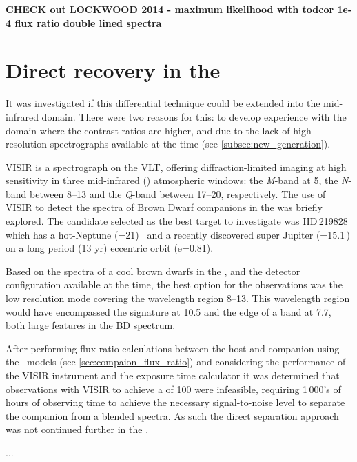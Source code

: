 \textbf{
CHECK out LOCKWOOD 2014 - maximum likelihood with todcor 1e-4 flux ratio double lined spectra}




\section{Direct recovery in the \mir{}}
It was investigated if this differential technique could be extended into the mid-infrared {\mir{}} domain.
There were two reasons for this: to develop experience with the {\mir{}} domain where the contrast ratios are higher, and due to the lack of high-resolution \nir{} spectrographs available at the time (see \cref{subsec:new_generation}).

{VISIR} is a \mir{} spectrograph on the {VLT}, offering diffraction-limited imaging at high sensitivity in three mid-infrared (\mir) atmospheric windows: the \emph{M}-band at 5\um{}, the \emph{N}-band between 8--13\um{} and the \emph{Q}-band between 17--20\um{}, respectively.
The use of {VISIR} to detect the spectra of Brown Dwarf companions in the {\mir{}} was briefly explored.
The candidate selected as the best target to investigate was {HD\,219828} which has a hot-Neptune (\Mtwosini{}=21\Mearth)~\citep{melo_new_2007} and a recently discovered super Jupiter (\Mtwosini{}=15.1\,\Mjup) on a long period (13 yr) eccentric orbit (e=0.81)\citep{santos_extreme_2016}.

Based on the spectra of a cool brown dwarfs in the \mir{}, and the detector configuration available at the time, the best option for the observations was the low resolution mode covering the wavelength region 8--13\um{}.
This wavelength region would have encompassed the  signature at 10.5\um{} and the edge of a  band at 7.7\um{}, both large features in the BD \mir{} spectrum.

After performing flux ratio calculations between the host and companion using the~\citet{baraffe_evolutionary_2003} models (see \cref{sec:compaion_flux_ratio}) and considering the performance of the {VISIR} instrument and the exposure time calculator it was determined that observations with {VISIR} to achieve a \snr{} of 100 were infeasible, requiring 1\,000's of hours of observing time to achieve the necessary signal-to-noise level to separate the companion from a blended spectra.
As such the direct separation approach was not continued further in the \mir{}.



...

